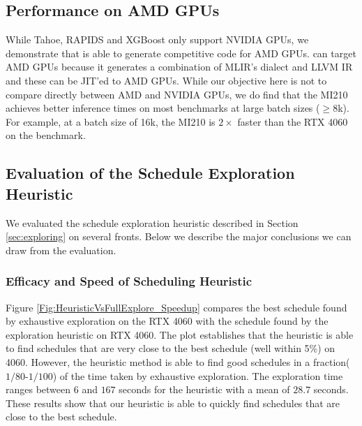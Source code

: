 \subsection{Performance on AMD GPUs}
While Tahoe, RAPIDS and XGBoost only support NVIDIA GPUs, we demonstrate that \Treebeard{} 
is able to generate competitive code for AMD GPUs. \Treebeard{} can target AMD GPUs 
because it generates a combination of MLIR's  dialect and LLVM IR 
and these can be JIT'ed to AMD GPUs. While our objective here is not to compare directly 
between AMD and NVIDIA GPUs, we do find that the MI210 achieves better inference times 
on most benchmarks at large batch sizes ($\geq8$k). For example, at a batch size of 16k,
the MI210 is $2\times$ faster than the RTX 4060 on the  benchmark. 

\subsection{Evaluation of the Schedule Exploration Heuristic}
We evaluated the schedule exploration heuristic described in Section \ref{sec:exploring} on several fronts.
Below we describe the major conclusions we can draw from the evaluation.

\subsubsection*{Efficacy and Speed of Scheduling Heuristic}
Figure \ref{Fig:HeuristicVsFullExplore_Speedup} compares the best schedule found by exhaustive exploration on the RTX 4060 
with the schedule found by the exploration heuristic on RTX 4060.
The plot establishes that the 
heuristic is able to find schedules that are very close to the best schedule (well 
within 5\%) on 4060. 
However, the heuristic method is able to find good schedules in a fraction($1/80$-$1/100$) of the time taken by exhaustive exploration.
The exploration time ranges between $6$ and $167$ seconds for the heuristic with a mean of $28.7$ seconds.
These results show that our heuristic is able to quickly find schedules that are close to the best schedule.

